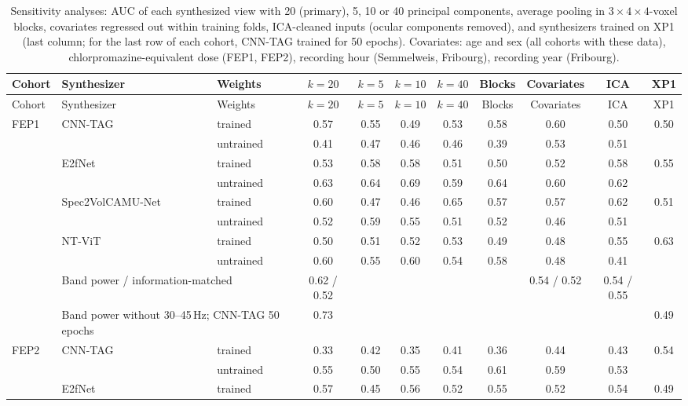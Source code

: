 \documentclass[10pt]{article}
\begin{document}
\begin{longtable}{l l l c c c c c c c c}
\caption{Sensitivity analyses: AUC of each synthesized view with 20 (primary), 5, 10 or 40 principal components, average pooling in $3\times4\times4$-voxel blocks, covariates regressed out within training folds, ICA-cleaned inputs (ocular components removed), and synthesizers trained on XP1 (last column; for the last row of each cohort, CNN-TAG trained for 50 epochs). Covariates: age and sex (all cohorts with these data), chlorpromazine-equivalent dose (FEP1, FEP2), recording hour (Semmelweis, Fribourg), recording year (Fribourg).}\label{tab:s_sens}\\
\toprule
Cohort & Synthesizer & Weights & $k=20$ & $k=5$ & $k=10$ & $k=40$ & Blocks & Covariates & ICA & XP1 \\
\midrule
\endfirsthead
\toprule
Cohort & Synthesizer & Weights & $k=20$ & $k=5$ & $k=10$ & $k=40$ & Blocks & Covariates & ICA & XP1 \\
\midrule
\endhead
FEP1 & CNN-TAG & trained & 0.57 & 0.55 & 0.49 & 0.53 & 0.58 & 0.60 & 0.50 & 0.50 \\
 &  & untrained & 0.41 & 0.47 & 0.46 & 0.46 & 0.39 & 0.53 & 0.51 &  \\
 & E2fNet & trained & 0.53 & 0.58 & 0.58 & 0.51 & 0.50 & 0.52 & 0.58 & 0.55 \\
 &  & untrained & 0.63 & 0.64 & 0.69 & 0.59 & 0.64 & 0.60 & 0.62 &  \\
 & Spec2VolCAMU-Net & trained & 0.60 & 0.47 & 0.46 & 0.65 & 0.57 & 0.57 & 0.62 & 0.51 \\
 &  & untrained & 0.52 & 0.59 & 0.55 & 0.51 & 0.52 & 0.46 & 0.51 &  \\
 & NT-ViT & trained & 0.50 & 0.51 & 0.52 & 0.53 & 0.49 & 0.48 & 0.55 & 0.63 \\
 &  & untrained & 0.60 & 0.55 & 0.60 & 0.54 & 0.58 & 0.48 & 0.41 &  \\
 & \multicolumn{2}{l}{Band power / information-matched} & 0.62 / 0.52 & & & & & 0.54 / 0.52 & 0.54 / 0.55 & \\
 & \multicolumn{2}{l}{Band power without 30--45\,Hz; CNN-TAG 50 epochs} & 0.73 & & & & & & & 0.49 \\ \midrule
FEP2 & CNN-TAG & trained & 0.33 & 0.42 & 0.35 & 0.41 & 0.36 & 0.44 & 0.43 & 0.54 \\
 &  & untrained & 0.55 & 0.50 & 0.55 & 0.54 & 0.61 & 0.59 & 0.53 &  \\
 & E2fNet & trained & 0.57 & 0.45 & 0.56 & 0.52 & 0.55 & 0.52 & 0.54 & 0.49 \\

\end{longtable}
\end{document}
